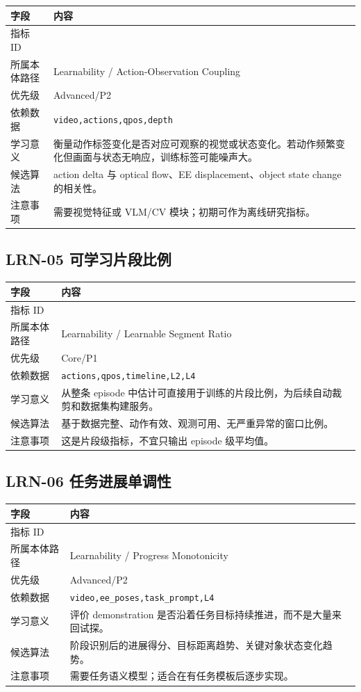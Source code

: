 \documentclass[UTF8,zihao=-4]{ctexart}
\newcommand{\Code}[1]{\texttt{#1}}
\newcommand{\MID}[1]{\texttt{\seqsplit{#1}}}
\begin{document}
\begin{longtable}{L{3.6cm} L{9.6cm}}
\toprule
字段 & 内容 \\
\midrule
指标 ID & \MID{LRN-04} \\
所属本体路径 & Learnability / Action-Observation Coupling \\
优先级 & Advanced/P2 \\
依赖数据 & \Code{video,actions,qpos,depth} \\
学习意义 & 衡量动作标签变化是否对应可观察的视觉或状态变化。若动作频繁变化但画面与状态无响应，训练标签可能噪声大。 \\
候选算法 & action delta 与 optical flow、EE displacement、object state change 的相关性。 \\
注意事项 & 需要视觉特征或 VLM/CV 模块；初期可作为离线研究指标。 \\
\bottomrule
\end{longtable}

\subsection{LRN-05 可学习片段比例}

\begin{longtable}{L{3.6cm} L{9.6cm}}
\toprule
字段 & 内容 \\
\midrule
指标 ID & \MID{LRN-05} \\
所属本体路径 & Learnability / Learnable Segment Ratio \\
优先级 & Core/P1 \\
依赖数据 & \Code{actions,qpos,timeline,L2,L4} \\
学习意义 & 从整条 episode 中估计可直接用于训练的片段比例，为后续自动裁剪和数据集构建服务。 \\
候选算法 & 基于数据完整、动作有效、观测可用、无严重异常的窗口比例。 \\
注意事项 & 这是片段级指标，不宜只输出 episode 级平均值。 \\
\bottomrule
\end{longtable}

\subsection{LRN-06 任务进展单调性}

\begin{longtable}{L{3.6cm} L{9.6cm}}
\toprule
字段 & 内容 \\
\midrule
指标 ID & \MID{LRN-06} \\
所属本体路径 & Learnability / Progress Monotonicity \\
优先级 & Advanced/P2 \\
依赖数据 & \Code{video,ee\_poses,task\_prompt,L4} \\
学习意义 & 评价 demonstration 是否沿着任务目标持续推进，而不是大量来回试探。 \\
候选算法 & 阶段识别后的进展得分、目标距离趋势、关键对象状态变化趋势。 \\
注意事项 & 需要任务语义模型；适合在有任务模板后逐步实现。 \\
\bottomrule
\end{longtable}
\end{document}
